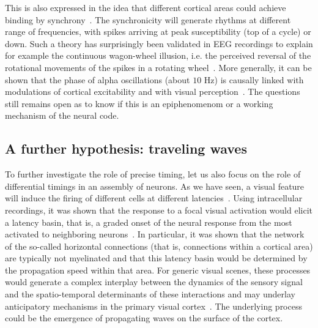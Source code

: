 \documentclass[brainsci, %
               review,submit,pdftex,moreauthors
               ]{Definitions/mdpi}
\begin{document}
This is also expressed in the idea that different cortical areas could achieve binding by synchrony~\citep{fries_mechanism_2005}. The synchronicity will generate rhythms at different range of frequencies, with spikes arriving at peak susceptibility (top of a cycle) or down. Such a theory has surprisingly been validated in EEG recordings to explain for example the continuous wagon-wheel illusion, i.e. the perceived reversal of the rotational movements of the spikes in a rotating wheel~\citep{vanrullen_continuous_2006}. More generally, it can be shown that the phase of alpha oscillations (about $10$ Hz) is causally linked with modulations of cortical excitability and with visual perception~\citep{dugue_phase_2011}. The questions still remains open as to know if this is an epiphenomenom or a working mechanism of the neural code.
%
\subsection{A further hypothesis: traveling waves}
%
To further investigate the role of precise timing, let us also focus on the role of differential timings in an assembly of neurons. As we have seen, a visual feature will induce the firing of different cells at different latencies~\citep{celebrini_dynamics_1993}. Using intracellular recordings, it was shown that the response to a focal visual activation would elicit a latency basin, that is, a graded onset of the neural response from the most activated to neighboring neurons~\citep{bringuier_horizontal_1999}. In particular, it was shown that the network of the so-called horizontal connections (that is, connections within a cortical area) are typically not myelinated and that this latency basin would be determined by the propagation speed within that area. For generic visual scenes, these processes would generate a complex interplay between the dynamics of the sensory signal and the spatio-temporal determinants of these interactions and may underlay anticipatory mechanisms in the primary visual cortex~\citep{benvenuti_anticipatory_2020,le_bec_horizontal_2022}. The underlying process could be the emergence of propagating waves on the surface of the cortex.
\end{document}
